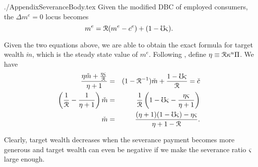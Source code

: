 \documentclass{econtex}
\begin{document}
\begin{verbatimwrite}{./AppendixSeveranceBody.tex}
Given the modified DBC of employed consumers, the $\Delta m^e=0$ locus becomes
\begin{equation}
m^e=\mathcal{R}(m^e-c^e)+(1-\mho\varsigma).
\end{equation}

Given the two equations above, we are able to obtain the exact formula for target wealth $\check{m}$, which is the steady state value of $m^e$. Following \cite{ctDiscrete}, define $\eta \equiv \mathcal{R} \kappa^{u} \Pi$. We have
\begin{eqnarray}
\frac{\eta\check{m}+\frac{\eta\varsigma}{\mathcal{R}}}{\eta+1}&=&(1-\mathcal{R}^{-1})\check{m}+\frac{1-\mho\varsigma}{\mathcal{R}}=\check{c}\nonumber\\
\left(\frac{1}{\mathcal{R}}-\frac{1}{\eta+1}\right)\check{m} &=& \frac{1}{\mathcal{R}}\left(1-\mho\varsigma-\frac{\eta\varsigma}{\eta+1}\right)\nonumber\\
\check{m}&=& \frac{(\eta+1)(1-\mho\varsigma)-\eta\varsigma}{\eta+1-\mathcal{R}}.
\end{eqnarray}

Clearly, target wealth decreases when the severance payment becomes
more generous and target wealth can even be negative if we make the
severance ratio $\varsigma$ large enough.
\end{verbatimwrite}



\end{document}
